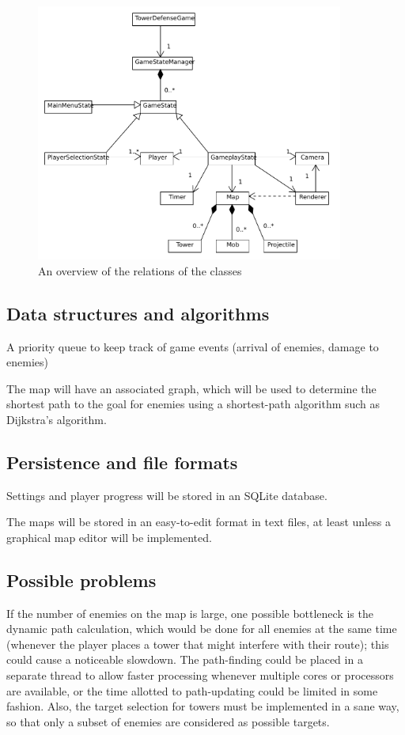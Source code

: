 \documentclass[11pt]{article}
\begin{document}
\begin{figure}[h!]
\centering
  \includegraphics[width=0.9\textwidth]{diagram.pdf}
  \caption{An overview of the relations of the classes}
\label{fig:classdiagram}
\end{figure}

\subsection{Data structures and algorithms}
\label{sec-3_1}

A priority queue to keep track of game events (arrival of enemies,
damage to enemies)

The map will have an associated graph, which will be used to determine
the shortest path to the goal for enemies using a shortest-path
algorithm such as Dijkstra's algorithm.

\subsection{Persistence and file formats}
\label{sec-3_3}

Settings and player progress will be stored in an SQLite database.

The maps will be stored in an easy-to-edit format in text files, at
least unless a graphical map editor will be implemented. 
\subsection{Possible problems}
\label{sec-3_4}


  If the number of enemies on the map is large, one possible
  bottleneck is the dynamic path calculation, which would be done for
  all enemies at the same time (whenever the player places a tower
  that might interfere with their route); this could cause a
  noticeable slowdown. The path-finding could be placed in a separate
  thread to allow faster processing whenever multiple cores or
  processors are available, or the time allotted to path-updating
  could be limited in some fashion. Also, the target selection for
  towers must be implemented in a sane way, so that only a subset of
  enemies are considered as possible targets.
\end{document}
